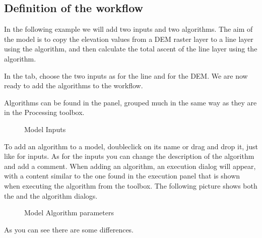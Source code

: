\documentclass[letterpaper,10pt,english]{sphinxmanual}
\begin{document}
\subsection{Definition of the workflow}
\label{\detokenize{Introduction/models:definition-of-the-workflow}}
\sphinxAtStartPar
In the following example we will add two inputs and two algorithms. The aim of
the model is to copy the elevation values from a DEM raster layer to a line layer
using the  algorithm,  and then calculate the total ascent of the line
layer using the  algorithm.

\sphinxAtStartPar
In the  tab, choose the two inputs as  for the line and
 for the DEM.
We are now ready to add the algorithms to the workflow.

\sphinxAtStartPar
Algorithms can be found in the  panel, grouped
much in the same way as they are in the Processing toolbox.

\begin{figure}[H]
\centering
\capstart

\noindent{}
\caption{Model Inputs}\label{\detokenize{Introduction/models:id4}}\label{\detokenize{Introduction/models:figure-model-parameter-inputs}}\end{figure}

\sphinxAtStartPar
To add an algorithm to a model, double\sphinxhyphen{}click on its name or drag and
drop it, just like for inputs. As for the inputs you can change the description
of the algorithm and add a comment.
When adding an algorithm, an execution dialog will appear, with a content similar
to the one found in the execution panel that is shown when executing the
algorithm from the toolbox.
The following picture shows both the  and the
 algorithm dialogs.

\begin{figure}[H]
\centering
\capstart

\noindent{}
\caption{Model Algorithm parameters}\label{\detokenize{Introduction/models:id5}}\label{\detokenize{Introduction/models:figure-model-parameter-alg}}\end{figure}

\sphinxAtStartPar
As you can see there are some differences.
\end{document}
